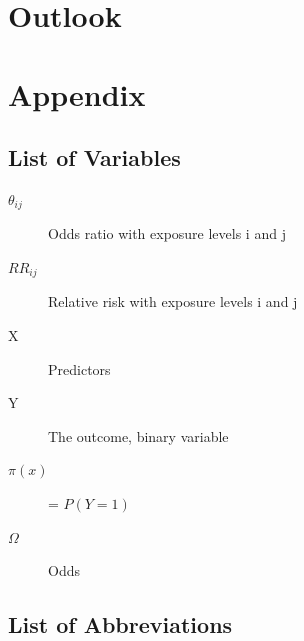 \documentclass[10pt,a4paper]{report}
\begin{document}
\chapter{Outlook}




\chapter{Appendix}
\section{List of Variables}

\begin{description}
\item[$\theta_{ij}$]
  Odds ratio with exposure levels i and j
\item[$RR_{ij}$]
  Relative risk with exposure levels i and j
\item[X]
  Predictors
\item[Y]
  The outcome, binary variable
\item[$\pi(x)$]
  = $P(Y=1)$
\item[$\Omega$]
  Odds
\end{description}

\section{List of Abbreviations}
\end{document}
